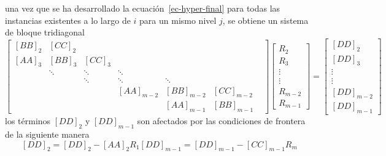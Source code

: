 \documentclass[letterpaper, openright, 12pt]{book}
\begin{document}
        una vez que se ha desarrollado la ecuación~\ref{ec-hyper-final} para
        todas las instancias existentes a lo largo de $i$ para un mismo nivel
        $j$, se obtiene un sistema de bloque tridiagonal
        \begin{equation}
            \begin{bmatrix}
            \left[ BB \right]_2 & \left[ CC \right]_2 & & & & \\
            \left[AA\right]_3 & \left[BB\right]_3 & \left[CC\right]_3 & & & \\
            & \ddots & \ddots &  \ddots & & \\
            & & \ddots & \ddots & \ddots & & \\
            & & & \left[AA\right]_{m-2} & \left[BB\right]_{m-2} & \left[CC\right]_{m-2}\\
            & & & & \left[AA\right]_{m-1} & \left[BB\right]_{m-1}
            \end{bmatrix}
            \begin{bmatrix}
            R_{2}\\
            R_{3}\\
            \vdots\\
            \vdots\\
            R_{m-2}\\
            R_{m-1}
            \end{bmatrix}
            = \begin{bmatrix}
            \left[DD\right]_2\\
            \left[DD\right]_3\\
            \vdots\\
            \vdots\\
            \left[DD\right]_{m-2}\\
            \left[DD\right]_{m-1}
            \end{bmatrix}
        \end{equation}
        los términos $\left[DD\right]_2$ y $\left[DD\right]_{m - 1}$ son
        afectados por las condiciones de frontera de la siguiente manera
        \begin{subequations}
            \begin{equation*}
                \left[DD\right]_2 = \left[DD\right]_2 - \left[AA\right]_2 R_1
            \end{equation*}
            \begin{equation*}
                \left[DD\right]_{m - 1} = \left[DD\right]_{m - 1} - \left[CC\right]_{m - 1} R_{m}
            \end{equation*}
        \end{subequations}
\end{document}
